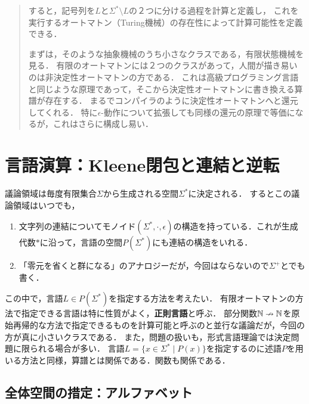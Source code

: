 \documentclass[uplatex, dvipdfmx]{jsreport}
\begin{document}
\begin{quotation}
    すると，記号列を$L$と$\Sigma^*\setminus L$の２つに分ける過程を計算と定義し，
    これを実行するオートマトン（Turing機械）の存在性によって計算可能性を定義できる．

    まずは，そのような抽象機械のうち小さなクラスである，有限状態機械を見る．
    有限のオートマトンには２つのクラスがあって，人間が描き易いのは非決定性オートマトンの方である．
    これは高級プログラミング言語と同じような原理であって，そこから決定性オートマトンに書き換える算譜が存在する．
    まるでコンパイラのように決定性オートマトンへと還元してくれる．
    特に$\epsilon$-動作について拡張しても同様の還元の原理で等価になるが，これはさらに構成し易い．
\end{quotation}

\section{言語演算：Kleene閉包と連結と逆転}

\begin{tcolorbox}[colframe=ForestGreen, colback=ForestGreen!10!white, breakable,
    title=議論領域は有限生成される空間，関係による指定が言語，その関係を特性関数とみるか算譜とみるか]
    議論領域は毎度有限集合$\Sigma$から生成される空間$\Sigma^*$に決定される．
    するとこの議論領域はいつでも，
    \begin{enumerate}
        \item 文字列の連結についてモノイド$(\Sigma^*,\cdot,\epsilon)$の構造を持っている．これが生成代数$*$に沿って，言語の空間$P(\Sigma^*)$にも連結の構造をいれる．
        \item 「零元を省くと群になる」のアナロジーだが，今回はならないので$\Sigma^+$とでも書く．
    \end{enumerate}
    この中で，言語$L\in P(\Sigma^*)$を指定する方法を考えたい．
    有限オートマトンの方法で指定できる言語は特に性質がよく，\textbf{正則言語}と呼ぶ．
    部分関数$\mathbb{N}\nrightarrow\mathbb{N}$を原始再帰的な方法で指定できるものを計算可能と呼ぶのと並行な議論だが，今回の方が真に小さいクラスである．
    また，問題の扱いも，形式言語理論では決定問題に限られる場合が多い．
    言語$L=\{x\in\Sigma^*\mid P(x)\}$を指定するのに述語$P$を用いる方法と同様，算譜とは関係である．関数も関係である．
\end{tcolorbox}

\subsection{全体空間の措定：アルファベット}
\end{document}
